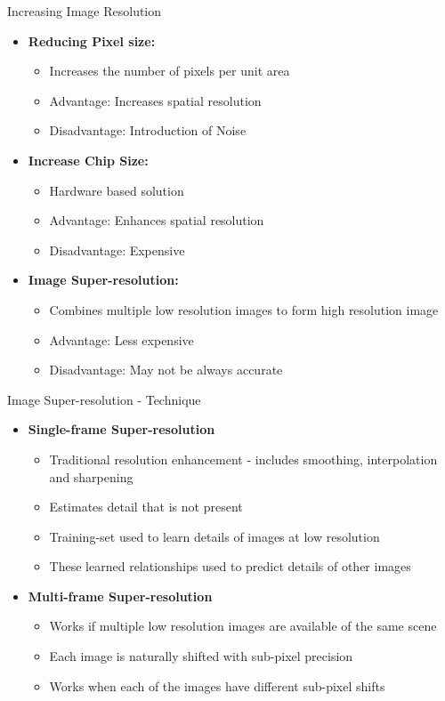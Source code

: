 \documentclass{beamer}
\begin{document}
	\begin{frame}{Increasing Image Resolution}
		\begin{itemize}
			\item \textbf{Reducing Pixel size:}
				\begin{itemize}
					\item Increases the number of pixels per unit area
					\item Advantage: Increases spatial resolution
					\item Disadvantage: Introduction of Noise
				\end{itemize}
			\item \textbf{Increase Chip Size:}
				\begin{itemize}
					\item Hardware based solution
					\item Advantage: Enhances spatial resolution
					\item Disadvantage: Expensive
				\end{itemize}
			\item \textbf{Image Super-resolution:}
				\begin{itemize}
					\item Combines multiple low resolution images to form high resolution image
					\item Advantage: Less expensive
					\item Disadvantage: May not be always accurate
				\end{itemize}
		\end{itemize}
	\end{frame}
	
	\begin{frame}{Image Super-resolution - Technique}
		\begin{itemize}
			\item \textbf{Single-frame Super-resolution}
			\begin{itemize}
				\item Traditional resolution enhancement  - includes smoothing, interpolation and sharpening
				\item Estimates detail that is not present
				\item Training-set used to learn details of images at low resolution
				\item These learned relationships used to predict details of other images
			\end{itemize}
			\item \textbf{Multi-frame Super-resolution}
			\begin{itemize}
				\item Works if multiple low resolution images are available of the same scene
				\item Each image is naturally shifted with sub-pixel precision
				\item Works when each of the images have different sub-pixel shifts
			\end{itemize}
		\end{itemize}
	\end{frame}
\end{document}
